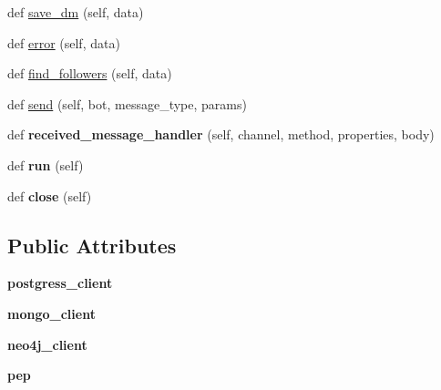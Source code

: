 \begin{DoxyCompactItemize}
\item 
def \hyperlink{classtwitter_1_1control__center_1_1dbwriter_1_1DBWriter_a6b55377307e8c59054e0f136942c4a79}{save\+\_\+dm} (self, data)
\item 
def \hyperlink{classtwitter_1_1control__center_1_1dbwriter_1_1DBWriter_aa6e8cefc09b703abee2c4b3a68d62fd1}{error} (self, data)
\item 
def \hyperlink{classtwitter_1_1control__center_1_1dbwriter_1_1DBWriter_a65e268dcff959f29e258113ef6043a76}{find\+\_\+followers} (self, data)
\item 
def \hyperlink{classtwitter_1_1control__center_1_1dbwriter_1_1DBWriter_a3a6e2d36449a7f745d31e328cc4d92d9}{send} (self, bot, message\+\_\+type, params)
\item 
\mbox{\label{classtwitter_1_1control__center_1_1dbwriter_1_1DBWriter_aa12d98995c446702bb434fff2e6ee0fd}} 
def {\bfseries received\+\_\+message\+\_\+handler} (self, channel, method, properties, body)
\item 
\mbox{\label{classtwitter_1_1control__center_1_1dbwriter_1_1DBWriter_a6236ff72370378d82719e4a74e120923}} 
def {\bfseries run} (self)
\item 
\mbox{\label{classtwitter_1_1control__center_1_1dbwriter_1_1DBWriter_aa06680faca4d475457fe1d19d95959ca}} 
def {\bfseries close} (self)
\end{DoxyCompactItemize}
\subsection*{Public Attributes}
\begin{DoxyCompactItemize}
\item 
\mbox{\label{classtwitter_1_1control__center_1_1dbwriter_1_1DBWriter_a6473c85a2b62791269ee42ce1731513c}} 
{\bfseries postgress\+\_\+client}
\item 
\mbox{\label{classtwitter_1_1control__center_1_1dbwriter_1_1DBWriter_acd3d98d13d85fb9335b8d4e9c866a2ab}} 
{\bfseries mongo\+\_\+client}
\item 
\mbox{\label{classtwitter_1_1control__center_1_1dbwriter_1_1DBWriter_a5375348c728a40d18617e644d4aa1c39}} 
{\bfseries neo4j\+\_\+client}
\item 
\mbox{\label{classtwitter_1_1control__center_1_1dbwriter_1_1DBWriter_a531422c00b00ab64a2ad93133bc0e4d2}} 
{\bfseries pep}
\end{DoxyCompactItemize}


